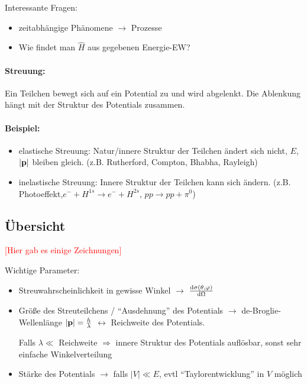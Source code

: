\documentclass[11pt,a4paper]{report}
\begin{document}
Interessante Fragen:

\begin{itemize}
\item zeitabhängige Phänomene $\rightarrow$ Prozesse
\item Wie findet man $\hat{H}$ aus gegebenen Energie-EW?
\end{itemize}

\paragraph{Streuung:} Ein Teilchen bewegt sich auf ein Potential zu und wird abgelenkt. Die Ablenkung hängt mit der Struktur des Potentials zusammen.

\paragraph{Beispiel:}
\begin{itemize}
\item elastische Streuung: Natur/innere Struktur der Teilchen ändert sich nicht, $E$, $|\mathbf{p}|$ bleiben gleich. (z.B. Rutherford, Compton, Bhabha, Rayleigh)
\item inelastische Streuung: Innere Struktur der Teilchen kann sich ändern. (z.B. Photoeffekt,\linebreak $e^- + H^{1s} \rightarrow e^- + H^{2s}$, $pp\rightarrow pp + \pi^0$)
\end{itemize}

\subsection{Übersicht}

\textcolor{red}{[Hier gab es einige Zeichnungen]}\par 

Wichtige Parameter:
\begin{itemize}
\item Streuwahrscheinlichkeit in gewisse Winkel $\rightarrow$ $\frac{\mathrm{d}\sigma (\theta , \varphi )}{\mathrm{d}\Omega}$
\item Größe des Streuteilchens / ``Ausdehnung'' des Potentials $\rightarrow$ de-Broglie-Wellenlänge $|\mathbf{p}|=\frac{h}{\lambda}$ $\leftrightarrow$ Reichweite des Potentials.\par 
Falls $\lambda \ll$ Reichweite $\Rightarrow$ innere Struktur des Potentials auflösbar, sonst sehr einfache Winkelverteilung
\item Stärke des Potentials $\rightarrow$ falls $|V|\ll E$, evtl ``Taylorentwicklung'' in $V$ möglich
\end{itemize}
\end{document}
